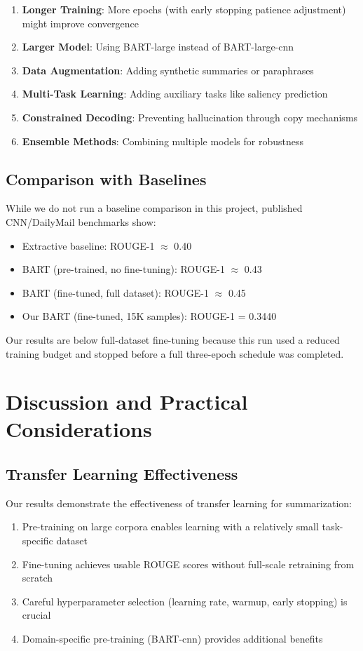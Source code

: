 \documentclass[12pt,a4paper,oneside]{report}
\begin{document}
\begin{enumerate}
    \item \textbf{Longer Training}: More epochs (with early stopping patience adjustment) might improve convergence
    \item \textbf{Larger Model}: Using BART-large instead of BART-large-cnn
    \item \textbf{Data Augmentation}: Adding synthetic summaries or paraphrases
    \item \textbf{Multi-Task Learning}: Adding auxiliary tasks like saliency prediction
    \item \textbf{Constrained Decoding}: Preventing hallucination through copy mechanisms
    \item \textbf{Ensemble Methods}: Combining multiple models for robustness
\end{enumerate}

\section{Comparison with Baselines}
While we do not run a baseline comparison in this project, published CNN/DailyMail benchmarks show:
\begin{itemize}
    \item Extractive baseline: ROUGE-1 $\approx$ 0.40
    \item BART (pre-trained, no fine-tuning): ROUGE-1 $\approx$ 0.43
    \item BART (fine-tuned, full dataset): ROUGE-1 $\approx$ 0.45
    \item Our BART (fine-tuned, 15K samples): ROUGE-1 = 0.3440
\end{itemize}

Our results are below full-dataset fine-tuning because this run used a reduced training budget and stopped before a full three-epoch schedule was completed.

\chapter{Discussion and Practical Considerations}
\label{ch:discussion}

\section{Transfer Learning Effectiveness}
Our results demonstrate the effectiveness of transfer learning for summarization:
\begin{enumerate}
    \item Pre-training on large corpora enables learning with a relatively small task-specific dataset
    \item Fine-tuning achieves usable ROUGE scores without full-scale retraining from scratch
    \item Careful hyperparameter selection (learning rate, warmup, early stopping) is crucial
    \item Domain-specific pre-training (BART-cnn) provides additional benefits
\end{enumerate}
\end{document}
